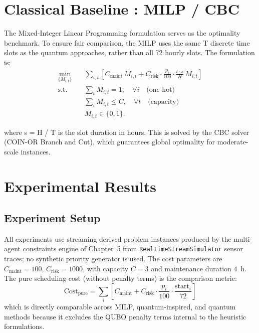\section{Classical Baseline : MILP / CBC}
The Mixed-Integer Linear Programming formulation serves as the optimality benchmark. To ensure fair comparison, the MILP uses the same T discrete time slots as the quantum approaches, rather than all 72 hourly slots. The formulation is:
\begin{equation}
\begin{aligned}
\min_{\{M_{i,t}\}} \quad 
& \sum_{i,t} \left[
C_{\text{maint}} \, M_{i,t} 
+ C_{\text{risk}} \cdot \frac{p_i}{100} \cdot \frac{t \cdot s}{H} \, M_{i,t}
\right] \\
\text{s.t.} \quad
& \sum_{t} M_{i,t} = 1, \quad \forall i \quad \text{(one-hot)} \\
& \sum_{i} M_{i,t} \leq C, \quad \forall t \quad \text{(capacity)} \\
& M_{i,t} \in \{0,1\}.
\end{aligned}
\end{equation}

where s = H / T is the slot duration in hours. This is solved by the CBC solver (COIN-OR Branch and Cut), which guarantees global optimality for moderate-scale instances.

\section{Experimental Results}
\subsection{Experiment Setup}
All experiments use streaming-derived problem instances produced by the multi-agent constraints engine of Chapter~5 from \texttt{RealtimeStreamSimulator} sensor traces; no synthetic priority generator is used. The cost parameters are $C_{\text{maint}} = 100$, $C_{\text{risk}} = 1000$, with capacity $C = 3$ and maintenance duration $4$~h. The pure scheduling cost (without penalty terms) is the comparison metric:
\begin{equation}
\text{Cost}_{\text{pure}}
= \sum_{i} \left[
C_{\text{maint}}
+ C_{\text{risk}} \cdot \frac{p_i}{100} \cdot \frac{\text{start}_i}{72}
\right]
\end{equation}
which is directly comparable across MILP, quantum-inspired, and quantum methods because it excludes the QUBO penalty terms internal to the heuristic formulations.

